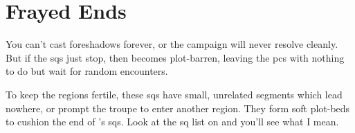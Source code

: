\section{Frayed Ends}

You can't cast foreshadows forever, or the \gls{campaign} will never resolve cleanly.
But if the \glspl{sq} just stop, then  becomes plot-barren, leaving the \glspl{pc} with nothing to do but wait for random encounters.

To keep the \glspl{region} fertile, these \glspl{sq} have small, unrelated \glspl{segment} which lead nowhere, or prompt the troupe to enter another \gls{region}.
They form soft plot-beds to cushion the end of 's \glspl{sq}.
Look at the \gls{sq} list on  and you'll see what I mean.
